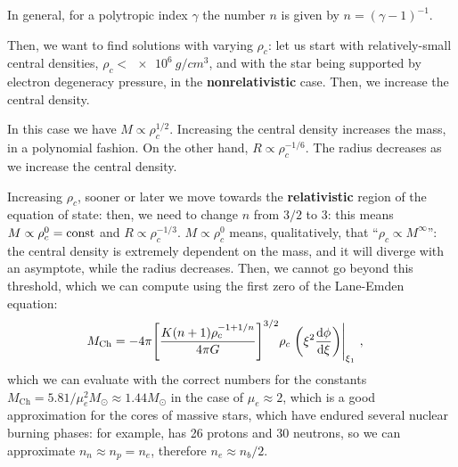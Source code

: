 \documentclass[main.tex]{subfiles}
\begin{document}
In general, for a polytropic index \(\gamma \) the number \(n\) is given by \(n = (\gamma - 1)^{-1}\).

Then, we want to find solutions with varying \(\rho _c\): let us start with relatively-small central densities, \(\rho _c < \SI{e6}{g / cm^3}\), and with the star being supported by electron degeneracy pressure, in the \textbf{nonrelativistic} case.
Then, we increase the central density. 

In this case we have \(M \propto \rho _c^{1/2}\). Increasing the central density increases the mass, in a polynomial fashion. 
On the other hand, \(R \propto \rho _c^{- 1/6}\). The radius decreases as we increase the central density. 

Increasing \(\rho _c\), sooner or later we move towards the \textbf{relativistic} region of the equation of state: then, we need to change \(n\) from \(3/2\) to \(3\): this means \(M \propto \rho _c^{0} = \text{const}\) and \(R \propto \rho _c^{- 1/3}\). \(M \propto \rho _c^{0}\) means, qualitatively,  that ``\(\rho _c \propto M^{\infty }\)'': the central density is extremely dependent on the mass, and it will diverge with an asymptote, while the radius decreases. 
Then, we cannot go beyond this threshold, which we can compute using the first zero of the Lane-Emden equation: 
%
\begin{align}
M _{\text{Ch}} &= - 4 \pi \qty[\frac{K (n+1) \rho _c^{-1 + 1/n}}{4 \pi G}]^{3/2} \rho _c \eval{\qty(\xi^2 \dv{\phi }{\xi })}_{\xi_1 }
\,,
\end{align}
%
which we can evaluate with the correct numbers for the constants \(M _{\text{Ch}} = \num{5.81} / \mu _e^2 M_{\odot} \approx \num{1.44} M_{\odot}\) in the case of \(\mu _e \approx 2\), which is a good approximation for the cores of massive stars, which have endured several nuclear burning phases: for example,  has 26 protons and 30 neutrons, so we can approximate \(n_n \approx n_p = n_e\), therefore \(n_e \approx n_b /2\).

\end{document}

